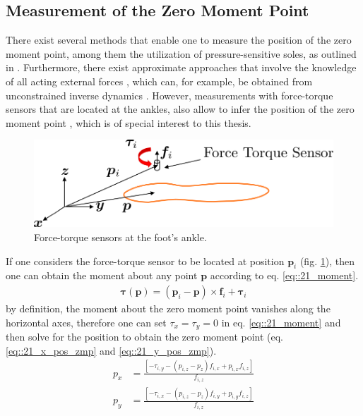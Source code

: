 \subsection{Measurement of the Zero Moment Point}
There exist several methods that enable one to measure the position of the zero moment point, among them the utilization of pressure-sensitive soles, as outlined in \cite{kajita2014introduction}. Furthermore, there exist approximate approaches that involve the knowledge of all acting external forces \cite{huang2001planning}, which can, for example, be obtained from unconstrained inverse dynamics \cite{michel2017dynamic}. However, measurements with force-torque sensors that are located at the ankles, also allow to infer the position of the zero moment point \cite{kajita2014introduction}, which is of special interest to this thesis.
\begin{figure}[h!]
	\centering
	\includegraphics[scale=.5]{chapters/02_foundations_for_humanoid_walking/img/ft_sensor.png}
	\caption{Force-torque sensors at the foot's ankle.}
	\label{fig::21_force_torque}
\end{figure}
If one considers the force-torque sensor to be located at position $\bm{p}_i$ (fig. \ref{fig::21_force_torque}), then one can obtain the moment about any point $\bm{p}$ according to eq. \ref{eq::21_moment}.
\begin{align}
	\bm{\tau}(\bm{p}) = (\bm{p}_i-\bm{p})\times \bm{f}_i + \bm{\tau}_i
	\label{eq::21_moment}
\end{align}
by definition, the moment about the zero moment point vanishes along the horizontal axes, therefore one can set $\tau_x = \tau_y = 0$ in eq. \ref{eq::21_moment} and then solve for the position to obtain the zero moment point (eq. \ref{eq::21_x_pos_zmp} and \ref{eq::21_y_pos_zmp}).
\begin{align}
	p_x &= \frac{\left[-\tau_{i,y}-(p_{i,z}-p_z)f_{i,x}+p_{i,x}f_{i,z}\right]}{f_{i,z}}
	\label{eq::21_x_pos_zmp}\\
	p_y &= \frac{\left[-\tau_{i,x}-(p_{i,z}-p_z)f_{i,y}+p_{i,y}f_{i,z}\right]}{f_{i,z}}
	\label{eq::21_y_pos_zmp}
\end{align}
